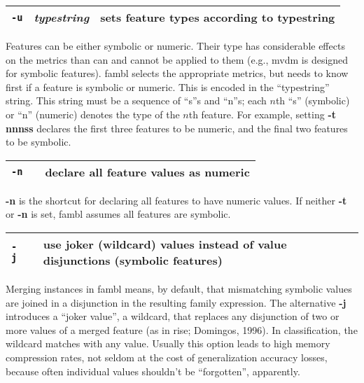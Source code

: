 \documentclass[11pt]{article}
\begin{document}
\begin{tabular}{|p{}|p{}|p{}|}
\hline
{\tt -u} & {\sl typestring} & sets feature types according to typestring \\
\hline
\end{tabular}

Features can be either symbolic or numeric. Their type has
considerable effects on the metrics than can and cannot be applied to
them (e.g., {\sc mvdm} is designed for symbolic features). {\sc fambl}
selects the appropriate metrics, but needs to know first if a feature
is symbolic or numeric. This is encoded in the ``typestring''
string. This string must be a sequence of ``s''s and ``n''s; each
$n$th ``s'' (symbolic) or ``n'' (numeric) denotes the type of the
$n$th feature. For example, setting {\bf -t nnnss} declares the first
three features to be numeric, and the final two features to be
symbolic. 
\ \\

\begin{tabular}{|p{}|p{}|p{}|}
\hline
{\tt -n} & & declare all feature values as numeric \\
\hline
\end{tabular}

{\bf -n} is the shortcut for declaring all features to have numeric
values. If neither {\bf -t} or {\bf -n} is set, {\sc fambl} assumes
all features are symbolic. 
\ \\

\begin{tabular}{|p{}|p{}|p{}|}
\hline
{\tt -j} & & use joker (wildcard) values instead of value disjunctions 
(symbolic features) \\
\hline
\end{tabular}

Merging instances in {\sc fambl} means, by default, that mismatching
symbolic values are joined in a disjunction in the resulting family
expression. The alternative {\bf -j} introduces a ``joker value'', a
wildcard, that replaces any disjunction of two or more values of a
merged feature (as in {\sc rise}; Domingos, 1996). In classification,
the wildcard matches with any value. Usually this option leads to high
memory compression rates, not seldom at the cost of generalization
accuracy losses, because often individual values shouldn't be
``forgotten'', apparently. 
\ \\
\end{document}

